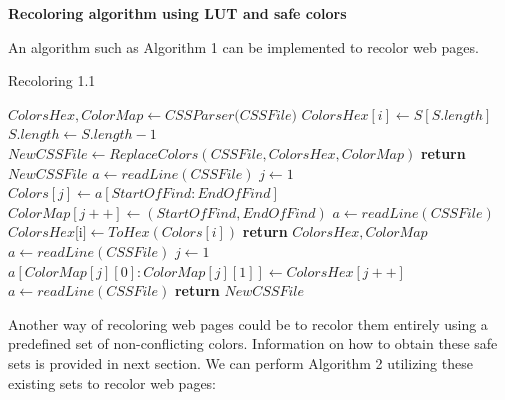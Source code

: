 \textbf{Recoloring algorithm using LUT and safe colors}


An algorithm such as Algorithm 1 can be implemented to recolor web pages.

\makeatletter
\def\BState{\State\hskip-\ALG@thistlm}
\makeatother

\begin{algorithm}[!htb]
\caption{Recoloring 1.1}\label{euclid}
\begin{algorithmic}[1]
\State ${ColorsHex,ColorMap} \gets \textit{CSSParser(CSSFile)}$ 
        		\State $ColorsHex[i] \gets S[S.length]$
        		\State $S.length \gets S.length - 1$
        	\EndIf
        \EndFor
      \EndFor
\State $NewCSSFile \gets ReplaceColors(CSSFile, ColorsHex, ColorMap)$
\State \textbf{return} $NewCSSFile$
\EndProcedure
{}
\State $a \gets readLine(CSSFile)$
\State $j \gets 1$
    \State $Colors[j] \gets a[StartOfFind:EndOfFind]$
    \State $ColorMap[j++] \gets (StartOfFind,EndOfFind)$
    \EndIf
    \State $a \gets readLine(CSSFile)$
  \EndWhile
{}
\State $ColorsHex[$i$] \gets ToHex(Colors[i])$
\EndFor
\State \textbf{return} $ColorsHex, ColorMap$
\EndProcedure
{}
\State $a \gets readLine(CSSFile)$
\State $j \gets 1$
    \State $a[ColorMap[j][0]:ColorMap[j][1]] \gets ColorsHex[j++]$ 
    \EndIf
    \State $a \gets readLine(CSSFile)$
  \EndWhile
\State \textbf{return} $NewCSSFile$
\EndProcedure
\end{algorithmic}
\end{algorithm}


Another way of recoloring web pages could be to recolor them entirely using a predefined set of non-conflicting colors. Information on how to obtain these safe sets is provided in next section. We can perform Algorithm 2 utilizing these existing sets to recolor web pages:


\makeatletter
\def\BState{\State\hskip-\ALG@thistlm}
\makeatother

